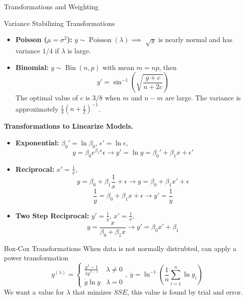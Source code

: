 \documentclass{article}
\DeclareMathOperator{\Bin}{Bin}
\DeclareMathOperator{\Pois}{Poisson}
\begin{document}
\begin{multicols*}{3}
\begin{blackbox}{Transformations and Weighting}
\begin{redbox}{Variance Stabilizing Transformations}
        \raggedleft
    \begin{itemize}[leftmargin=7pt]
    \item \textbf{Poisson ($\mu = \sigma^2$):} $y \sim \Pois(\lambda) \implies$  $\sqrt{y}$ is nearly normal and has variance $1/4$ if $\lambda$ is large.
    \item \textbf{Binomial:} $y \sim \Bin(n,p)$ with mean $m=np$, then \\[-2ex]
    \[y' = \sin^{-1}\left(\sqrt{\frac{y + c}{n + 2c}}\right)\]
    The optimal value of $c$ is $3/8$ when $m$ and $n-m$ are large. The variance is approximately $\frac{1}{4}\left(n+\frac{1}{2}\right)^{-1}$.
        \end{itemize}
    \end{redbox}
    \textbf{Transformations to Linearize Models.}
        \begin{itemize}[leftmargin=7pt]
            \item \textbf{Exponential:} $\beta_0' = \ln \beta_0$, $\epsilon' = \ln \epsilon$,\\[-2ex]
            \[y = \beta_0e^{\beta_1x}\epsilon  \rightarrow y' = \ln y = \beta_0' + \beta_1x + \epsilon' \]
            \item \textbf{Reciprocal:} $x' = \frac{1}{x}$, \\[-2ex]
            \[y = \beta_0 + \beta_1\frac{1}{x}+ \epsilon \rightarrow y = \beta_0 + \beta_1x' + \epsilon\]
            \[\frac{1}{y} = \beta_0 + \beta_1x + \epsilon \rightarrow y' = \frac{1}{y}\]
            \item \textbf{Two Step Reciprocal:} $y' = \frac{1}{y}$, $x' = \frac{1}{x}$, \\[-2ex]
            \[y = \frac{x}{\beta_0 + \beta_1x} \rightarrow y' = \beta_0x' + \beta_1\]
        \end{itemize}
    \begin{bluebox}{Box-Cox Transformations}
        When data is not normally distrubted, can apply a power transformation \\[-1ex]
        \[y^{(\lambda)} = \begin{cases}
            \frac{y^\lambda - 1}{\lambda \dot{y}^{\lambda-1}} & \lambda \neq 0\\
            \dot{y}\ln y & \lambda = 0
        \end{cases}, \ \dot{y} = \ln^{-1}\left(\frac{1}{n}\sum_{i=1}^n \ln y_i\right)\]
        We want a value for $\lambda$ that mimizes $SSE$, this value is found by trial and error.

\end{bluebox}
\end{blackbox}
\end{multicols*}
\end{document}
